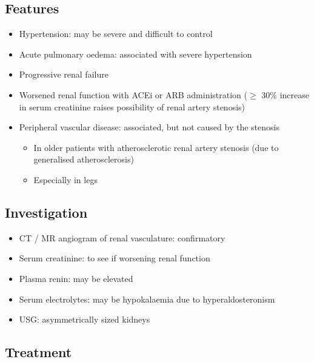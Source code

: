 \documentclass[
  12pt,
]{memoir}
\providecommand{\tightlist}{%
  \setlength{\itemsep}{0pt}\setlength{\parskip}{0pt}}
\begin{document}
\hypertarget{features-24}{%
\subsection{Features}\label{features-24}}

\begin{itemize}
\tightlist
\item
  Hypertension: may be severe and difficult to control
\item
  Acute pulmonary oedema: associated with severe hypertension
\item
  Progressive renal failure
\item
  Worsened renal function with ACEi or ARB administration (\(\ge\) 30\%
  increase in serum creatinine raises possibility of renal artery
  stenosis)
\item
  Peripheral vascular disease: associated, but not caused by the
  stenosis

  \begin{itemize}
  \tightlist
  \item
    In older patients with atherosclerotic renal artery stenosis (due to
    generalised atherosclerosis)
  \item
    Especially in legs
  \end{itemize}
\end{itemize}

\hypertarget{investigation-25}{%
\subsection{Investigation}\label{investigation-25}}

\begin{itemize}
\tightlist
\item
  CT / MR angiogram of renal vasculature: confirmatory
\item
  Serum creatinine: to see if worsening renal function
\item
  Plasma renin: may be elevated
\item
  Serum electrolytes: may be hypokalaemia due to hyperaldosteronism
\item
  USG: asymmetrically sized kidneys
\end{itemize}

\hypertarget{treatment-16}{%
\subsection{Treatment}\label{treatment-16}}
\end{document}
